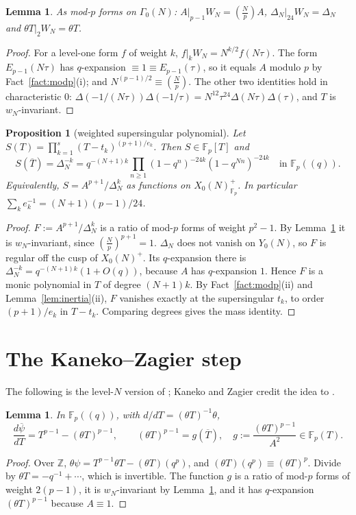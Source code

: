 \documentclass[11pt,a4paper]{article}
\numberwithin{equation}{section}
\newtheorem{proposition}[theorem]{Proposition}
\newtheorem{lemma}[theorem]{Lemma}
\theoremstyle{definition}
\theoremstyle{remark}
\newcommand{\Fp}{\mathbb F_p}
\newcommand{\Z}{\mathbb Z}
\newcommand{\Lp}[1]{\left(\frac{#1}{p}\right)}
\begin{document}
\begin{lemma}\label{lem:AW}
As mod-$p$ forms on $\Gamma_0(N)$: $A|_{p-1}W_N=\Lp{N}A$, $\Delta_N|_{24}W_N=\Delta_N$ and
$\theta T|_2W_N=\theta T$.
\end{lemma}
\begin{proof}
For a level-one form $f$ of weight $k$, $f|_kW_N=N^{k/2}f(N\tau)$. The form $E_{p-1}(N\tau)$ has
$q$-expansion $\equiv1\equiv E_{p-1}(\tau)$, so it equals $A$ modulo $p$ by Fact~\ref{fact:modp}(i);
and $N^{(p-1)/2}\equiv\Lp N$. The other two identities hold in characteristic $0$:
$\Delta(-1/(N\tau))\Delta(-1/\tau)=N^{12}\tau^{24}\Delta(N\tau)\Delta(\tau)$, and $T$ is
$w_N$-invariant.
\end{proof}

\begin{proposition}[weighted supersingular polynomial]\label{prop:S}
Let $S(T)=\prod_{k=1}^s(T-t_k)^{(p+1)/e_k}$. Then $S\in\Fp[T]$ and
\[
S(\overline T)=\Delta_N^{-k}=q^{-(N+1)k}\prod_{n\ge1}(1-q^n)^{-24k}(1-q^{Nn})^{-24k}\quad\text{in }\Fp((q)).
\]
Equivalently, $S=A^{p+1}/\Delta_N^{k}$ as functions on $X_0(N)^+_{\Fp}$. In particular
$\sum_k e_k^{-1}=(N+1)(p-1)/24$.
\end{proposition}
\begin{proof}
$F:=A^{p+1}/\Delta_N^k$ is a ratio of mod-$p$ forms of weight $p^2-1$. By Lemma~\ref{lem:AW} it is
$w_N$-invariant, since $\Lp N^{p+1}=1$. $\Delta_N$ does not vanish on $Y_0(N)$, so $F$ is regular off the cusp of
$X_0(N)^+$. Its $q$-expansion there is $\Delta_N^{-k}=q^{-(N+1)k}(1+O(q))$, because $A$ has
$q$-expansion $1$. Hence $F$ is a monic polynomial in $T$ of degree $(N+1)k$. By
Fact~\ref{fact:modp}(ii) and Lemma~\ref{lem:inertia}(ii), $F$ vanishes exactly at the supersingular
$t_k$, to order $(p+1)/e_k$ in $T-t_k$. Comparing degrees gives the mass identity.
\end{proof}

\section{The Kaneko--Zagier step}\label{sec:kz}

The following is the level-$N$ version of \citet[\S10, (35)--(38)]{KZ98}; Kaneko and Zagier credit the
idea to \citet{Koike73}.

\begin{lemma}\label{lem:dpsi}
In $\Fp((q))$, with $d/dT=(\theta T)^{-1}\theta$,
\[
\frac{d\overline\psi}{dT}=T^{p-1}-(\theta T)^{p-1},\qquad (\theta T)^{p-1}=g(\overline T),\quad
g:=\frac{(\theta T)^{p-1}}{A^2}\in\Fp(T).
\]
\end{lemma}
\begin{proof}
Over $\Z$, $\theta\psi=T^{p-1}\theta T-(\theta T)(q^p)$, and $(\theta T)(q^p)\equiv(\theta T)^p$.
Divide by $\theta T=-q^{-1}+\cdots$, which is invertible. The function $g$ is a ratio of mod-$p$
forms of weight $2(p-1)$, it is $w_N$-invariant by Lemma~\ref{lem:AW}, and it has $q$-expansion
$(\theta T)^{p-1}$ because $A\equiv1$.
\end{proof}
\end{document}
